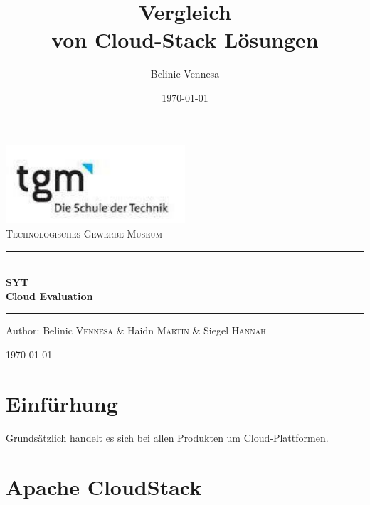 \documentclass[a4paper,nochapterprefix,ngerman,12pt]{scrreprt}
\title{Vergleich\\von Cloud-Stack Lösungen}
\author{Belinic Vennesa}
\date{\today}
\begin{document}
\begin{titlepage}
\begin{center}
\includegraphics[width=0.5\textwidth]{logo}\\[1cm]    

\textsc{\LARGE Technologisches Gewerbe Museum}\\[1.5cm]

\rule{1.0\textwidth}{1mm}
{ \huge \bfseries  \\\large SYT\\ \huge Cloud Evaluation \\[0.4cm] }

\rule{1.0\textwidth}{1mm}

\noindent 
\vspace{7cm}

\begin{center}
\large
Author: 
Belinic \textsc{Vennesa} \&
Haidn \textsc{Martin} \&
Siegel \textsc{Hannah}
\end{center}

\vfill

{\large \today}

\end{center}
\end{titlepage}

\newpage
\tableofcontents

\newpage
{}

\chapter{Einfürhung} \thispagestyle{fancy}
Grundsätzlich handelt es sich bei allen Produkten um Cloud-Plattformen.
\chapter{Apache CloudStack} \thispagestyle{fancy}
\end{document}
